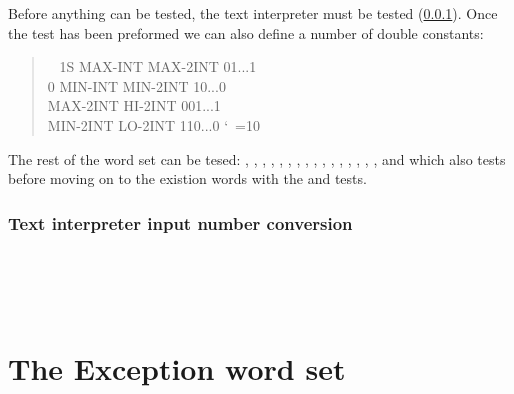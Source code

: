 Before anything can be tested, the text interpreter must be
tested (\ref{test:dbl:in}).
Once the \linebreak {} test has been preformed
we can also define a number of double constants:

\begin{quote}\ttfamily\frenchspacing\obeyspaces
~     1S MAX-INT  MAX-2INT    01...1 \\\mbox{}
      0 MIN-INT  MIN-2INT    10...0 \\
MAX-2INT        HI-2INT     001...1 \\
MIN-2INT        LO-2INT     110...0
\nonfrenchspacing\catcode`\ =10
\end{quote}

The rest of the word set can be tesed:
,
, ,
, ,
, ,
, ,
, ,
, , \linebreak
{}, ,
,  and
 which also tests  before moving on
to the existion words with the
 and  tests.

\setcounter{subsection}{3}
\setcounter{subsubsection}{1}
\subsubsection{Text interpreter input number conversion}
\label{test:dbl:in}

 \\
 \\
 \\



\section{The Exception word set} %


